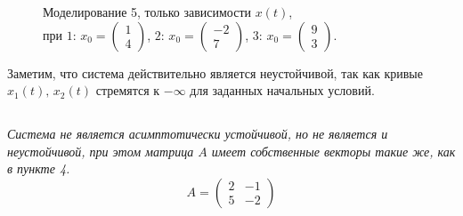 \documentclass[a5paper, 10pt]{article}
\theoremstyle{definition}
\theoremstyle{plain}
\theoremstyle{remark}
\begin{document}
\begin{figure}[h!]
\caption{Моделирование 5, только зависимости $x(t)$, \\при  $1: \, x_0 = \begin{pmatrix} 1 \\ 4 \end{pmatrix}$, $2: \, x_0 = \begin{pmatrix} -2 \\ 7 \end{pmatrix}$, $3: \, x_0 = \begin{pmatrix} 9 \\ 3 \end{pmatrix}$.}
\end{figure}

\newpage
Заметим, что система действительно является неустойчивой, так как кривые $x_1(t), \, x_2(t)$ стремятся к $-\infty$ для заданных начальных условий.

\newpage
\subsection{}
\textit{Система не является асимптотически устойчивой, но не является и неустойчивой, при этом матрица $A$ имеет собственные векторы такие же, как в пункте 4.}
\begin{equation}
A =
\begin{pmatrix}
2 & -1  \\
5 & -2
\end{pmatrix}
\end{equation}
\end{document}
